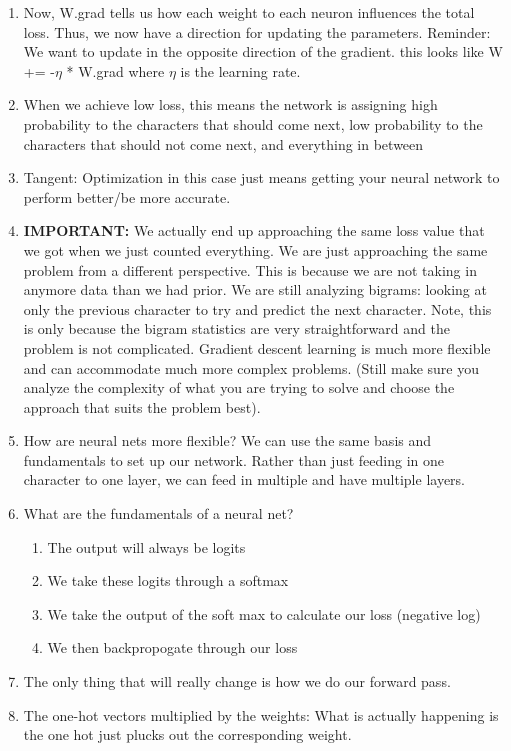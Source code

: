 \documentclass[a4paper, 11pt, oneside]{researchjournal} %
\begin{document}
\begin{enumerate}
    \item Now, W.grad tells us how each weight to each neuron influences the total loss. Thus, we now have a direction for updating the parameters. Reminder: We want to update in the opposite direction of the gradient. this looks like W += -$\eta$ * W.grad where $\eta$ is the learning rate. 
    \item When we achieve low loss, this means the network is assigning high probability to the characters that should come next, low probability to the characters that should not come next, and everything in between
    \item Tangent: Optimization in this case just means getting your neural network to perform better/be more accurate. 
    \item \textbf{IMPORTANT: }We actually end up approaching the same loss value that we got when we just counted everything. We are just approaching the same problem from a different perspective. This is because we are not taking in anymore data than we had prior. We are still analyzing bigrams: looking at only the previous character to try and predict the next character. Note, this is only because the bigram statistics are very straightforward and the problem is not complicated. Gradient descent learning is much more flexible and can accommodate much more complex problems. (Still make sure you analyze the complexity of what you are trying to solve and choose the approach that suits the problem best). 
    \item How are neural nets more flexible? We can use the same basis and fundamentals to set up our network. Rather than just feeding in one character to one layer, we can feed in multiple and have multiple layers. 
    \item What are the fundamentals of a neural net? 
    \begin{enumerate}
        \item The output will always be logits
        \item We take these logits through a softmax
        \item We take the output of the soft max to calculate our loss (negative log)
        \item We then backpropogate through our loss
    \end{enumerate}
    \item The only thing that will really change is how we do our forward pass. 
    \item The one-hot vectors multiplied by the weights: What is actually happening is the one hot just plucks out the corresponding weight. 

\end{enumerate}
\end{document}

